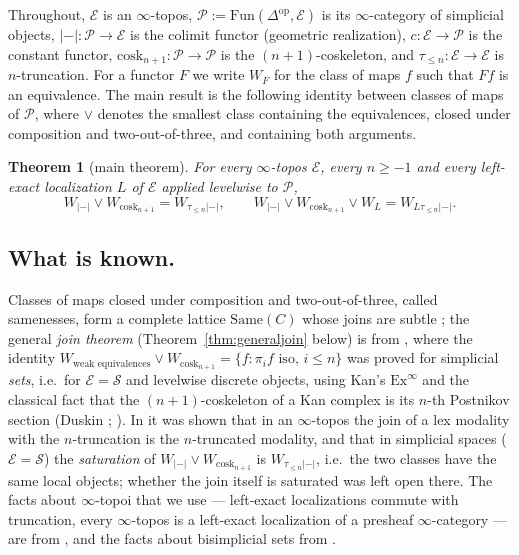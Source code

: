 \documentclass[11pt]{amsart}
\newtheorem{thm}{Theorem}[section]
\theoremstyle{definition}
\newcommand{\Same}{\mathrm{Same}}
\newcommand{\cosk}{\mathrm{cosk}}
\newcommand{\Fun}{\mathrm{Fun}}
\newcommand{\sS}{\mathcal S}
\newcommand{\E}{\mathcal E}
\newcommand{\sP}{\mathcal P}
\newcommand{\tr}[1]{\tau_{\le #1}}
\newcommand{\re}{|{-}|}
\begin{document}
Throughout, $\E$ is an $\infty$-topos, $\sP:=\Fun(\Delta^{\mathrm{op}},\E)$
is its $\infty$-category of simplicial objects,
$\re\colon\sP\to\E$ is the colimit functor (geometric realization), $c\colon\E\to\sP$
is the constant functor, $\cosk_{n+1}\colon\sP\to\sP$ is the $(n{+}1)$-coskeleton,
and $\tr n\colon\E\to\E$ is $n$-truncation. For a functor $F$ we write
$W_F$ for the class of maps $f$ such that $Ff$ is an equivalence. The main
result is the following identity between classes of maps of $\sP$, where
$\vee$ denotes the smallest class containing the equivalences, closed under
composition and two-out-of-three, and containing both arguments.

\begin{thm}[main theorem]\label{thm:main}
For every $\infty$-topos $\E$, every $n\ge-1$ and every left-exact localization
$L$ of $\E$ applied levelwise to $\sP$,
\[
W_{\re}\vee W_{\cosk_{n+1}}=W_{\tr n\re},\qquad
W_{\re}\vee W_{\cosk_{n+1}}\vee W_{L}=W_{L\tr n\re}.
\]
\end{thm}

\subsection*{What is known.}
Classes of maps closed under composition and two-out-of-three, called
samenesses, form a complete lattice $\Same(C)$ whose joins are subtle
\cite{Same}; the general \emph{join theorem} (Theorem~\ref{thm:generaljoin}
below) is from \cite{Postnikov}, where the identity
$W_{\text{weak equivalences}}\vee W_{\cosk_{n+1}}=\{f:\pi_if\text{ iso, }i\le n\}$
was proved for simplicial \emph{sets}, i.e.\ for $\E=\sS$ and levelwise
discrete objects, using Kan's $\mathrm{Ex}^\infty$ and the classical fact that
the $(n{+}1)$-coskeleton of a Kan complex is its $n$-th Postnikov section
(Duskin \cite{Duskin}; \cite[VI]{GJ}). In \cite{Topjoin} it was shown that
in an $\infty$-topos the join of a lex modality with the $n$-truncation is
the $n$-truncated modality, and that in simplicial spaces
($\E=\sS$) the \emph{saturation} of $W_{\re}\vee W_{\cosk_{n+1}}$ is
$W_{\tr n\re}$, i.e.\ the two classes have the same local objects; whether the
join itself is saturated was left open there. The facts about $\infty$-topoi
that we use --- left-exact localizations commute with truncation, every
$\infty$-topos is a left-exact localization of a presheaf $\infty$-category ---
are from \cite{HTT}, and the facts about bisimplicial sets from \cite[IV.1]{GJ}.
\end{document}
